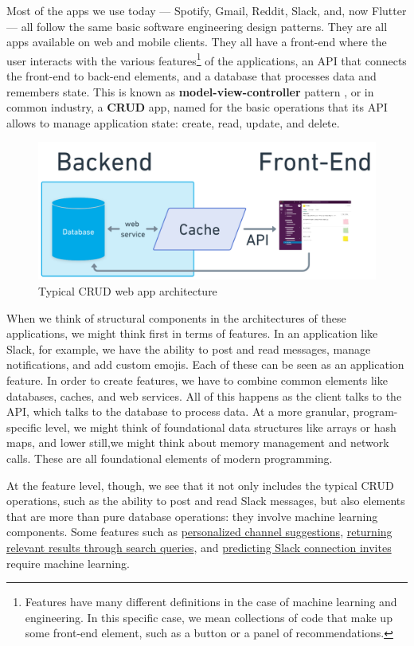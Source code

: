 \documentclass[11pt]{diazessay} %
\begin{document}
Most of the apps we use today --- Spotify, Gmail, Reddit, Slack, and, now Flutter ---   all follow the same basic software engineering design patterns. They are all apps available on web and mobile clients. They all have a front-end where the user interacts with the various features\footnote{Features have many different definitions in the case of machine learning and engineering. In this specific case, we mean collections of code that make up some front-end element, such as a button or a panel of recommendations.} of the applications, an API that connects the front-end to back-end elements, and a database that processes data and remembers state. This is known as \textbf{model-view-controller} pattern \citep{fowler2012patterns}, or in common industry, a \textbf{CRUD} app, named for the basic operations that its API allows to manage application state: create, read, update, and delete. 
 
\begin{figure}[H]
\centering
\includegraphics[width=.9\textwidth]{figures/web_service.png}
\caption{Typical CRUD web app architecture}
\end{figure}

When we think of structural components in the architectures of these applications, we might think first in terms of features. In an application like Slack, for example, we have the ability to post and read messages, manage notifications, and add custom emojis. Each of these can be seen as an application feature. In order to create features, we have to combine common elements like databases, caches, and web services. All of this happens as the client talks to the API, which talks to the database to process data. At a more granular, program-specific level, we might think of foundational data structures like arrays or hash maps, and lower still,we might think about memory management and network calls. These are all foundational elements of modern programming. 

At the feature level, though, we see that it not only includes the typical CRUD operations, such as the ability to post and read Slack messages, but also elements that are more than pure database operations: they involve machine learning components. Some features such as \href{https://slack.engineering/personalized-channel-recommendations-in-slack/}{personalized channel suggestions}, \href{https://slack.engineering/search-at-slack/}{returning relevant results through search queries}, and \href{https://slack.engineering/email-classification/}{predicting Slack connection invites} require machine learning.
\end{document}
